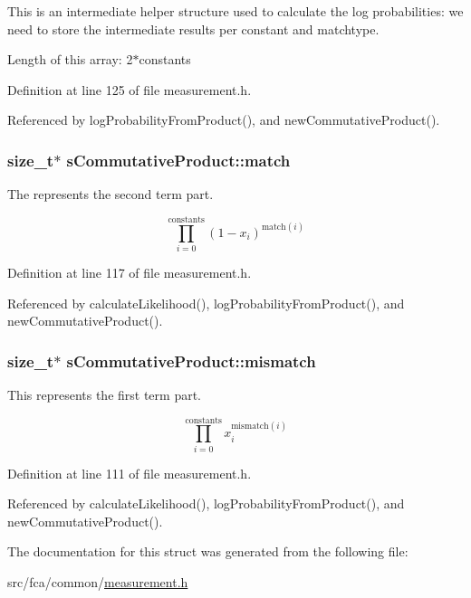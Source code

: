 \-This is an intermediate helper structure used to calculate the log probabilities\-: we need to store the intermediate results per constant and matchtype. 

\-Length of this array\-: 2$\ast$constants 

\-Definition at line 125 of file measurement.\-h.



\-Referenced by log\-Probability\-From\-Product(), and new\-Commutative\-Product().

\hypertarget{structsCommutativeProduct_ae78261dbaf0a6455774a84836fe7334d}{
\subsubsection[{match}]{\setlength{\rightskip}{0pt plus 5cm}size\-\_\-t$\ast$ {\bf s\-Commutative\-Product\-::match}}}\label{structsCommutativeProduct_ae78261dbaf0a6455774a84836fe7334d}


\-The represents the second term part. 

\[ \prod_{i=0}^{\mathrm{constants}} (1-x_i)^{\mathrm{match}(i)} \] 

\-Definition at line 117 of file measurement.\-h.



\-Referenced by calculate\-Likelihood(), log\-Probability\-From\-Product(), and new\-Commutative\-Product().

\hypertarget{structsCommutativeProduct_a95aa7c0ea80854b88afc16d913137f35}{
\subsubsection[{mismatch}]{\setlength{\rightskip}{0pt plus 5cm}size\-\_\-t$\ast$ {\bf s\-Commutative\-Product\-::mismatch}}}\label{structsCommutativeProduct_a95aa7c0ea80854b88afc16d913137f35}


\-This represents the first term part. 

\[ \prod_{i=0}^{\mathrm{constants}} x_i^{\mathrm{mismatch}(i)} \] 

\-Definition at line 111 of file measurement.\-h.



\-Referenced by calculate\-Likelihood(), log\-Probability\-From\-Product(), and new\-Commutative\-Product().



\-The documentation for this struct was generated from the following file\-:\begin{DoxyCompactItemize}
\item 
src/fca/common/\hyperlink{common_2measurement_8h}{measurement.\-h}\end{DoxyCompactItemize}
